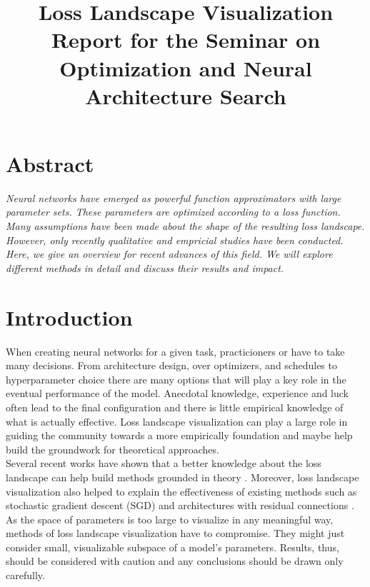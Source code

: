 \documentclass[a4paper]{scrartcl}
\title{\textbf{Loss Landscape Visualization}\\\small Report for the Seminar on Optimization and Neural Architecture Search}
\begin{document}
	
	
	

\maketitle



\section*{Abstract}
\textit{Neural networks have emerged as powerful function approximators with large parameter sets. These parameters are optimized according to a loss function. Many assumptions have been made about the shape of the resulting loss landscape. However, only recently qualitative and empricial studies have been conducted. Here, we give an overview for recent advances of this field. We will explore different methods in detail and discuss their results and impact.}



\section*{Introduction}
When creating neural networks for a given task, practicioners or have to take many decisions. From architecture design, over optimizers, and schedules to hyperparameter choice there are many options that will play a key role in the eventual performance of the model. Anecdotal knowledge, experience and luck often lead to the final configuration and there is little empirical knowledge of what is actually effective. Loss landscape visualization can play a large role in guiding the community towards a more empirically foundation and maybe help build the groundwork for theoretical approaches.\\
Several recent works have shown that a better knowledge about the loss landscape can help build methods grounded in theory \cite{mutschler2020parabolic, chaudhari2019entropy}. Moreover, loss landscape visualization also helped to explain the effectiveness of existing methods such as stochastic gradient descent (SGD) \cite{robbins1951stochastic, xing2018walk} and architectures with residual connections \cite{he2016deep, li2017visualizing}.\\
As the space of parameters is too large to visualize in any meaningful way, methods of loss landscape visualization have to compromise. They might just consider small, visualizable subspace of a model's parameters. Results, thus, should be considered with caution and any conclusions should be drawn only carefully.
\end{document}
